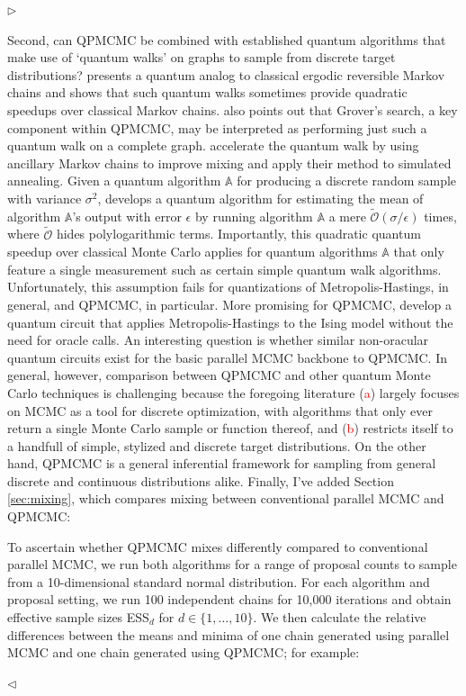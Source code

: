 \documentclass[12pt]{article}
\newenvironment{reply}{$\triangleright$\bfseries}{$\triangleleft$}
\renewenvironment{quote}
               {\list{}{\rightmargin\leftmargin}%
                \item\relax\normalfont}
               {\endlist}
\begin{document}
\begin{reply}
\begin{quote}
Second, can QPMCMC be combined with established quantum algorithms that make use of `quantum walks' on graphs to sample from discrete target distributions?  \citet{szegedy2004quantum} presents a quantum analog to classical ergodic reversible Markov chains and shows that such quantum walks sometimes provide quadratic speedups over classical Markov chains.  \citet{szegedy2004quantum} also points out that Grover's search, a key component within QPMCMC, may be interpreted as performing just such a quantum walk on a complete graph.  \citet{wocjan2008speedup} accelerate the quantum walk by using ancillary Markov chains to improve mixing and apply their method to simulated annealing.  Given a quantum algorithm $\mathbb{A}$ for producing a discrete random sample with variance $\sigma^2$, \citet{montanaro} develops a quantum algorithm for estimating the mean of algorithm $\mathbb{A}$'s output with error $\epsilon$ by running algorithm $\mathbb{A}$ a mere $\widetilde{\mathcal{O}}(\sigma/\epsilon)$ times, where $\widetilde{\mathcal{O}}$ hides polylogarithmic terms. Importantly, this quadratic quantum speedup over classical Monte Carlo applies for quantum algorithms $\mathbb{A}$ that only feature a single measurement such as certain simple quantum walk algorithms. Unfortunately, this assumption fails for quantizations of Metropolis-Hastings, in general, and QPMCMC, in particular. More promising for QPMCMC, \citet{lemieux2020efficient} develop a quantum circuit that applies Metropolis-Hastings to the Ising model without the need for oracle calls.  An interesting question is whether similar non-oracular quantum circuits exist for the basic parallel MCMC backbone to QPMCMC.  In general, however, comparison between QPMCMC and other quantum Monte Carlo techniques is challenging because the foregoing literature (\textcolor{red}{a}) largely focuses on MCMC as a tool for discrete optimization, with algorithms that only ever return a single Monte Carlo sample or function thereof, and (\textcolor{red}{b}) restricts itself to a handfull of simple, stylized and discrete target distributions.  On the other hand, QPMCMC is a general inferential framework for sampling from general discrete and continuous distributions alike.
	\end{quote}
Finally, I've added Section \ref{sec:mixing}, which compares mixing between conventional parallel MCMC and QPMCMC:
\begin{quote}
	To ascertain whether QPMCMC mixes differently compared to conventional parallel MCMC, we run both algorithms for a range of proposal counts to sample from a 10-dimensional standard normal distribution. For each algorithm and proposal setting, we run 100 independent chains for 10,000 iterations and obtain effective sample sizes ESS$_d$ for $d \in \{1,\dots,10\}$.   We then calculate the relative differences between the means and minima of one chain generated using parallel MCMC and one chain generated using QPMCMC; for example:

\end{quote}
\end{reply}
\end{document}
